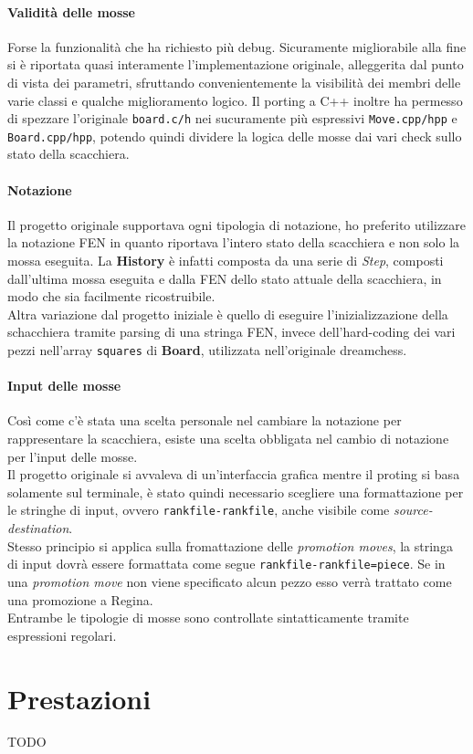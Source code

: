 \documentclass{article}
\begin{document}
        \paragraph{Validità delle mosse}
            Forse la funzionalità che ha richiesto più debug.
            Sicuramente migliorabile alla fine si è riportata quasi interamente l'implementazione originale, alleggerita dal punto di vista dei parametri, sfruttando convenientemente la visibilità dei membri delle varie classi e qualche miglioramento logico.
            Il porting a C++ inoltre ha permesso di spezzare l'originale \texttt{board.c/h} nei sucuramente più espressivi \texttt{Move.cpp/hpp} e \texttt{Board.cpp/hpp}, potendo quindi dividere la logica delle mosse dai vari check sullo stato della scacchiera. 
        \paragraph{Notazione}
            Il progetto originale supportava ogni tipologia di notazione, ho preferito utilizzare la notazione FEN in quanto riportava l'intero stato della scacchiera e non solo la mossa eseguita.
            La \textbf{History} è infatti composta da una serie di \textit{Step}, composti dall'ultima mossa eseguita e dalla FEN dello stato attuale della scacchiera, in modo che sia facilmente ricostruibile.\\
            Altra variazione dal progetto iniziale è quello di eseguire l'inizializzazione della schacchiera tramite parsing di una stringa FEN, invece dell'hard-coding dei vari pezzi nell'array \texttt{squares} di \textbf{Board}, utilizzata nell'originale dreamchess.
        \paragraph{Input delle mosse}
            Così come c'è stata una scelta personale nel cambiare la notazione per rappresentare la scacchiera, esiste una scelta obbligata nel cambio di notazione per l'input delle mosse.\\
            Il progetto originale si avvaleva di un'interfaccia grafica mentre il proting si basa solamente sul terminale, è stato quindi necessario scegliere una formattazione per le stringhe di input, ovvero \texttt{rankfile-rankfile}, anche visibile come \textit{source-destination}.\\
            Stesso principio si applica sulla fromattazione delle \textit{promotion moves}, la stringa di input dovrà essere formattata come segue \texttt{rankfile-rankfile=piece}. Se in una \textit{promotion move} non viene specificato alcun pezzo esso verrà trattato come una promozione a Regina.\\
            Entrambe le tipologie di mosse sono controllate sintatticamente tramite espressioni regolari.
    \newpage
    \section{Prestazioni}
        TODO
\end{document}
